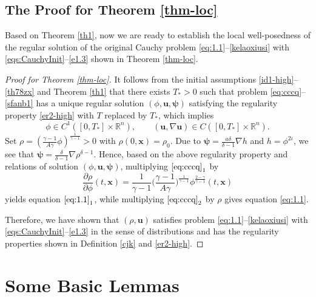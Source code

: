 \documentclass[11pt,reqno]{amsart}
\numberwithin{rk}{section}
\numberwithin{prop}{section}
\numberwithin{mydef}{section}
\numberwithin{lem}{section}
\numberwithin{equation}{section}
\numberwithin{thm}{section}
\begin{document}
\subsection{The Proof for Theorem \ref{thm-loc}}
Based on Theorem \ref{th1}, now we are ready to establish the local well-posedness of the regular solution of the original Cauchy problem \eqref{eq:1.1}--\eqref{kelaoxiusi} with \eqref{eqs:CauchyInit}--\eqref{e1.3}  shown in Theorem \ref{thm-loc}.
\begin{proof}[Proof for Theorem \ref{thm-loc}] 
It follows from the initial assumptions  \eqref{id1-high}--\eqref{th78zx} and Theorem \ref{th1} that there exists $T_{*}> 0$ such that problem \eqref{eq:cccq}--\eqref{sfanb1} has a unique regular solution $(\phi,\boldsymbol{u},\boldsymbol{\psi})$ satisfying the regularity property \eqref{er2-high} with $T$ replaced by $T_*$, which implies 
\begin{equation*} 
\phi\in C^1([0,T_{*}]\times \mathbb{R}^n), \qquad (\boldsymbol{u}, \nabla \boldsymbol{u}) \in   C([0,T_{*}]\times \mathbb{R}^n).
\end{equation*}
Set $\rho=(\frac{\gamma-1}{A\gamma}\phi)^{\frac{1}{\gamma-1}}>0$ with $\rho(0,\boldsymbol{x})=\rho_0$. Due to $\boldsymbol{\psi}=\frac{a\delta}{\delta-1}\nabla h$ and $h=\phi^{2\iota}$, we see that  $\boldsymbol{\psi}=\frac{\delta}{\delta-1}\nabla \rho^{\delta-1}$. Hence, based on the above regularity property and relations of solution $(\phi,\boldsymbol{u},\boldsymbol{\psi})$,  multiplying $\eqref{eq:cccq}_1$ by
\begin{equation*}
\frac{\partial \rho}{\partial \phi}(t,\boldsymbol{x})=\frac{1}{\gamma-1}\Big(\frac{\gamma-1}{A\gamma}\Big)^{\frac{1}{\gamma-1}}\phi^{\frac{2-\gamma}{\gamma-1}}(t,\boldsymbol{x})
\end{equation*}
yields equation $\eqref{eq:1.1}_1$, while multiplying $\eqref{eq:cccq}_2$ by $\rho$ gives equation  \eqref{eq:1.1}.

Therefore, we have shown that $(\rho,\boldsymbol{u})$ satisfies problem \eqref{eq:1.1}--\eqref{kelaoxiusi} with \eqref{eqs:CauchyInit}--\eqref{e1.3}  in the sense of distributions and has the regularity properties shown in Definition \ref{cjk} and \eqref{er2-high}. 
\end{proof}



\appendix



\section{Some Basic Lemmas}\label{appA}
\end{document}
